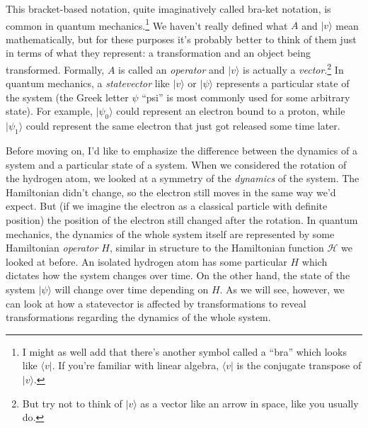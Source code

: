 This bracket-based notation, quite imaginatively called bra-ket notation, is common in quantum mechanics.\footnote{I might as well add that there's another symbol called a ``bra'' which looks like $\langle v|$. If you're familiar with linear algebra, $\langle v|$ is the conjugate transpose of $|v\rangle$.} We haven't really defined what $A$ and $|v\rangle$ mean mathematically, but for these purposes it's probably better to think of them just in terms of what they represent: a transformation and an object being transformed. Formally, $A$ is called an \emph{operator} and $|v\rangle$ is actually a \emph{vector}.\footnote{But try not to think of $|v\rangle$ as a vector like an arrow in space, like you usually do.} In quantum mechanics, a \emph{statevector} like $|v\rangle$ or $|\psi\rangle$ represents a particular state of the system (the Greek letter $\psi$ ``psi'' is most commonly used for some arbitrary state). For example, $|\psi_0\rangle$ could represent an electron bound to a proton, while $|\psi_1\rangle$ could represent the same electron that just got released some time later.

Before moving on, I'd like to emphasize the difference between the dynamics of a system and a particular state of a system. When we considered the rotation of the hydrogen atom, we looked at a symmetry of the \emph{dynamics} of the system. The Hamiltonian didn't change, so the electron still moves in the same way we'd expect. But (if we imagine the electron as a classical particle with definite position) the position of the electron still changed after the rotation. In quantum mechanics, the dynamics of the whole system itself are represented by some Hamiltonian \emph{operator} $H$, similar in structure to the Hamiltonian function $\mathscr{H}$ we looked at before. An isolated hydrogen atom has some particular $H$ which dictates how the system changes over time. On the other hand, the state of the system $|\psi\rangle$ will change over time depending on $H$. As we will see, however, we can look at how a statevector is affected by transformations to reveal transformations regarding the dynamics of the whole system.

